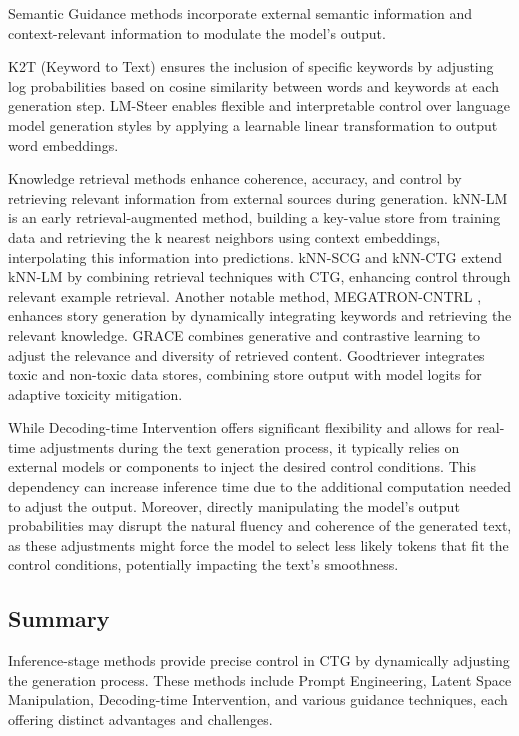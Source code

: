 \documentclass[acmsmall, screen]{acmart}
\begin{document}
Semantic Guidance methods incorporate external semantic information and context-relevant information to modulate the model's output. 

K2T (Keyword to Text) \cite{pascual_emnlp21_K2T} ensures the inclusion of specific keywords by adjusting log probabilities based on cosine similarity between words and keywords at each generation step.
LM-Steer \cite{han_acl24_LM-Steer} enables flexible and interpretable control over language model generation styles by applying a learnable linear transformation to output word embeddings.

Knowledge retrieval methods enhance coherence, accuracy, and control by retrieving relevant information from external sources during generation.
kNN-LM \cite{Khandelwal_iclr20_kNN-LM} is an early retrieval-augmented method, building a key-value store from training data and retrieving the k nearest neighbors using context embeddings, interpolating this information into predictions. 
kNN-SCG \cite{trotta_gem22_kNN-SCG} and kNN-CTG \cite{nawezi_tllm23_kNN-CTG} extend kNN-LM by combining retrieval techniques with CTG, enhancing control through relevant example retrieval.
Another notable method, MEGATRON-CNTRL \cite{xu_emnlp20_MEGATRON-CNTRL}, enhances story generation by dynamically integrating keywords and retrieving the relevant knowledge.
GRACE \cite{wen_acl23_GRACE} combines generative and contrastive learning to adjust the relevance and diversity of retrieved content.
Goodtriever \cite{pozzobon_emnlp23_goodtriever} integrates toxic and non-toxic data stores, combining store output with model logits for adaptive toxicity mitigation.

While Decoding-time Intervention offers significant flexibility and allows for real-time adjustments during the text generation process, it typically relies on external models or components to inject the desired control conditions. This dependency can increase inference time due to the additional computation needed to adjust the output. Moreover, directly manipulating the model's output probabilities may disrupt the natural fluency and coherence of the generated text, as these adjustments might force the model to select less likely tokens that fit the control conditions, potentially impacting the text's smoothness.

\subsection{Summary}

Inference-stage methods provide precise control in CTG by dynamically adjusting the generation process. These methods include Prompt Engineering, Latent Space Manipulation, Decoding-time Intervention, and various guidance techniques, each offering distinct advantages and challenges.
\end{document}
